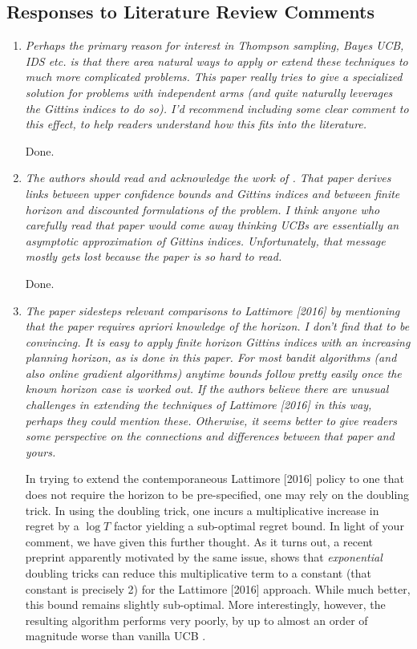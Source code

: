 \documentclass[11pt]{article}
\newcommand{\1}{\ensuremath{\mathbf{1}}} %
\theoremstyle{thm-sf}
\begin{document}
	
	\subsection{Responses to Literature Review Comments}
	
	\begin{enumerate}
		\item {\it Perhaps the primary reason for interest in Thompson sampling, Bayes UCB, IDS etc. is that there area natural ways to apply or extend these techniques to much more complicated problems. This paper really tries to give a specialized solution for problems with independent arms (and quite naturally leverages the Gittins indices to do so). I'd recommend including some clear comment to this effect, to help readers understand how this fits into the literature.}
		
		Done. 
		
		\item {\it The authors should read and acknowledge the work of \cite{chang1987optimal}. That paper derives links between upper confidence bounds and Gittins indices and between finite horizon and discounted formulations of the problem. I think anyone who carefully read that paper would come away thinking UCBs are essentially an asymptotic approximation of Gittins indices. Unfortunately, that message mostly gets lost because the paper is so hard to read.}
		
		Done. 
		
		\item {\it The paper sidesteps relevant comparisons to Lattimore [2016] by mentioning that the paper requires apriori knowledge of the horizon. I don't find that to be convincing. It is easy to apply finite horizon Gittins indices with an increasing planning horizon, as is done in this paper. For most bandit algorithms (and also online gradient algorithms) anytime bounds follow pretty easily once the known horizon case is worked out. If the authors believe there are unusual challenges in extending the techniques of Lattimore [2016] in this way, perhaps they could mention these. Otherwise, it seems better to give readers some perspective on the connections and differences between that paper and yours.
		}
		
{\color{blue} 		
In trying to extend the contemporaneous Lattimore [2016] policy to one that does not require the horizon to be pre-specified, one may rely on the doubling trick. In using the doubling trick, one incurs a multiplicative increase in regret by a $\log T$ factor yielding a sub-optimal regret bound. In light of your comment, we have given this further thought. As it turns out, a recent preprint \citep{besson2018doubling} apparently motivated by the same issue, shows that {\em exponential} doubling tricks can reduce this multiplicative term to a constant (that constant is precisely 2) for the Lattimore [2016] approach. While much better, this bound remains slightly sub-optimal. More interestingly, however, the resulting algorithm performs very poorly, by up to almost an order of magnitude worse than vanilla UCB \citep{besson2018doubling}}.
		
	\end{enumerate}
	
\end{document}
